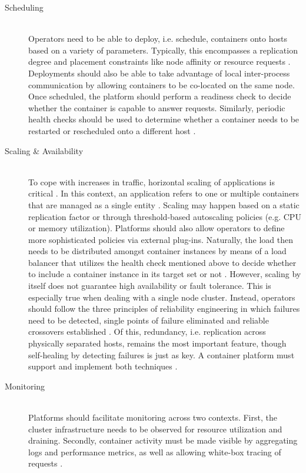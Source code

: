 \begin{description}
  \item[Scheduling]
  \hfill \\
  Operators need to be able to deploy, i.e. schedule, containers onto hosts based on a variety of parameters. Typically, this encompasses a replication degree and placement constraints like \gls{node affinity} or resource requests \cite[p.~225]{casalicchio2019container}. Deployments should also be able to take advantage of local inter-process communication by allowing containers to be co-located on the same node. Once scheduled, the platform should perform a readiness check to decide whether the container is capable to answer requests. Similarly, periodic health checks should be used to determine whether a container needs to be restarted or rescheduled onto a different host \cite[p.~2]{al2019container}.

  \item[Scaling \& Availability]
  \hfill \\
  To cope with increases in traffic, horizontal scaling of applications is critical \cite[p.~1]{al2019container}. In this context, an application refers to one or multiple containers that are managed as a single entity \cite[p.~44]{khan2017key} \cite[p.~2]{pahl2017cloud}. Scaling may happen based on a static replication factor or through threshold-based autoscaling policies (e.g. \acs{CPU} or memory utilization). Platforms should also allow operators to define more sophisticated policies via external plug-ins. Naturally, the load then needs to be distributed amongst container instances by means of a load balancer that utilizes the health check mentioned above to decide whether to include a container instance in its target set or not \cite[pp.~225--226]{casalicchio2019container} \cite[p.~2]{al2019container}. However, scaling by itself does not guarantee high availability or fault tolerance. This is especially true when dealing with a single node cluster. Instead, operators should follow the three principles of reliability engineering in which failures need to be detected, single points of failure eliminated and reliable crossovers established \cite[p.~45]{khan2017key}. Of this, redundancy, i.e. replication across physically separated hosts, remains the most important feature, though self-healing by detecting failures is just as key. A container platform must support and implement both techniques \cite[p.~176]{vayghan2019microservice} \cite[p.~53]{burns2016borg}.

  \item[Monitoring]
  \hfill \\
  Platforms should facilitate monitoring across two contexts. First, the cluster infrastructure needs to be observed for resource utilization and draining. Secondly, container activity must be made visible by aggregating logs and performance metrics, as well as allowing \gls{white-box tracing} of requests \cite[p.~47]{khan2017key}.
\end{description}

